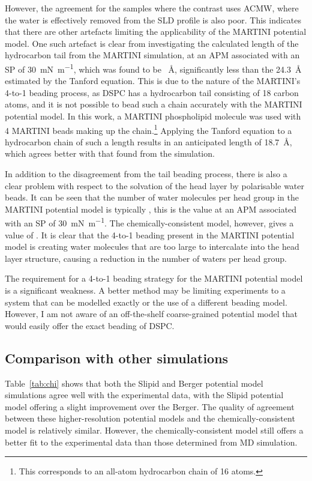 However, the agreement for the samples where the contrast uses ACMW, where the water is effectively removed from the SLD profile is also poor.
This indicates that there are other artefacts limiting the applicability of the MARTINI potential model.
One such artefact is clear from investigating the calculated length of the hydrocarbon tail from the MARTINI simulation, at an APM associated with an SP of \SI{30}{\milli\newton\per\meter}, which was found to be ~\si{\angstrom}, significantly less than the \SI{24.3}{\angstrom} estimated by the Tanford equation.\autocite[which has the form $t_t = (1.5 + 1.265)n_c$ \AA, where $t_t$ is the length and $n_c$ is the number of carbon atoms]{tanford_hydrophobic_1980}
This is due to the nature of the MARTINI's 4-to-1 beading process, as DSPC has a hydrocarbon tail consisting of 18 carbon atoms, and it is not possible to bead such a chain accurately with the MARTINI potential model.
In this work, a MARTINI phospholipid molecule was used with 4 MARTINI beads making up the chain.\footnote{This corresponds to an all-atom hydrocarbon chain of 16 atoms.}
Applying the Tanford equation to a hydrocarbon chain of such a length results in an anticipated length of \SI{18.7}{\angstrom}, which agrees better with that found from the simulation.

In addition to the disagreement from the tail beading process, there is also a clear problem with respect to the solvation of the head layer by polarisable water beads.
It can be seen that the number of water molecules per head group in the MARTINI potential model is typically , this is the value at an APM associated with an SP of \SI{30}{\milli\newton\per\meter}.
The chemically-consistent model, however, gives a value of .
It is clear that the 4-to-1 beading present in the MARTINI potential model is creating water molecules that are too large to intercalate into the head layer structure, causing a reduction in the number of waters per head group.

The requirement for a 4-to-1 beading strategy for the MARTINI potential model is a significant weakness.
A better method may be limiting experiments to a system that can be modelled exactly or the use of a different beading model.
However, I am not aware of an off-the-shelf coarse-grained potential model that would easily offer the exact beading of DSPC.

\subsection{Comparison with other simulations}
Table~\ref{tab:chi} shows that both the Slipid and Berger potential model simulations agree well with the experimental data, with the Slipid potential model offering a slight improvement over the Berger.
The quality of agreement between these higher-resolution potential models and the chemically-consistent model is relatively similar.
However, the chemically-consistent model still offers a better fit to the experimental data than those determined from MD simulation.

